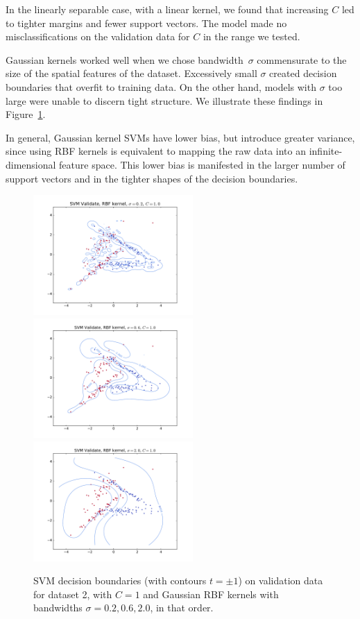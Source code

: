 \documentclass{article}
\begin{document}
\begin{multicols}{2}
In the linearly separable case, with a linear kernel,
we found that increasing $C$ led to tighter margins and fewer support vectors.
The model made no misclassifications on the validation data for $C$ in the range we tested.

Gaussian kernels worked well when we chose bandwidth~$\sigma$
commensurate to the size of the spatial features of the dataset.
Excessively small $\sigma$ created decision boundaries that overfit to training data.
On the other hand, models with $\sigma$ too large were unable to discern tight structure.
We illustrate these findings in Figure~\ref{fig:2-3-gaussian-rbf}.

In general,
Gaussian kernel SVMs have lower bias,
but introduce greater variance,
since using RBF kernels is equivalent to
mapping the raw data into an infinite-dimensional feature space.
This lower bias is manifested
in the larger number of support vectors
and in the tighter shapes of the decision boundaries.

\begin{figure}[t]
   \centering
   \includegraphics[width=2.4in]{img/p2-3-d2-c1-rbf02/validate.pdf}
   \includegraphics[width=2.4in]{img/p2-3-d2-c1-rbf06/validate.pdf}
   \includegraphics[width=2.4in]{img/p2-3-d2-c1-rbf20/validate.pdf}
   \caption{SVM decision boundaries (with contours $t = \pm1$) on validation data for dataset 2, with $C = 1$ and Gaussian RBF kernels with bandwidths $\sigma=0.2,0.6,2.0$, in that order.}
   \label{fig:2-3-gaussian-rbf}
\end{figure}


\end{multicols}
\end{document}
